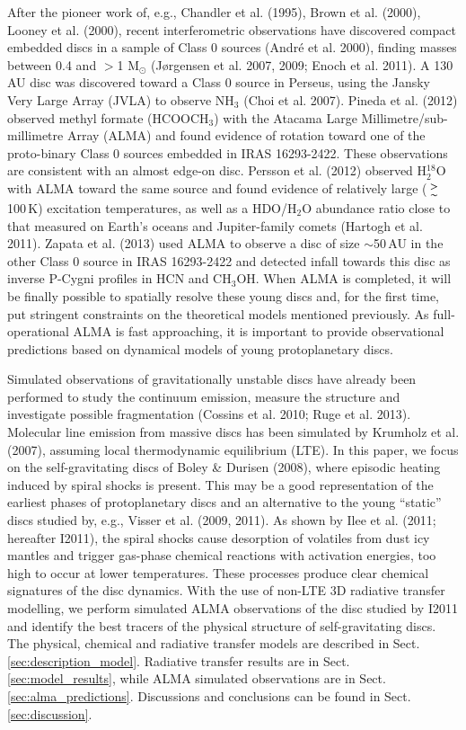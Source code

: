 \documentclass[useAMS,usenatbib]{mn2e}
\begin{document}
After the pioneer work of, e.g., Chandler et al. (1995), Brown et al. (2000), Looney et al. (2000), recent interferometric observations have discovered compact embedded discs in a sample of Class 0 sources (Andr\'e et al. 2000), finding masses between 0.4 and  $>$1 M$_{\odot}$ (J\o rgensen et al. 2007, 2009; Enoch et al. 2011). A 130\,AU disc was discovered toward a Class 0 source in Perseus, using the Jansky Very Large Array (JVLA) to observe NH$_3$ (Choi et al. 2007). Pineda et al. (2012) observed methyl formate (HCOOCH$_3$) with the Atacama Large Millimetre/sub-millimetre Array (ALMA) and found evidence of rotation toward one of the proto-binary Class 0 sources embedded in IRAS 16293-2422. These observations are consistent with an almost edge-on disc. Persson et al. (2012) observed H$_2^{18}$O with ALMA toward the same source and found evidence of relatively large ($\ga$100\,K) excitation temperatures, as well as a HDO/H$_2$O abundance ratio close to that measured on Earth's oceans and Jupiter-family comets (Hartogh et al. 2011). Zapata et al. (2013) used ALMA to observe a disc of size $\sim$50$\,$AU in the other Class 0 source in IRAS 16293-2422 and detected infall towards this disc as inverse P-Cygni profiles in HCN and CH$_3$OH. When ALMA is completed, it will be finally possible to spatially resolve these young discs and, for the first time, put stringent constraints on the theoretical models mentioned previously. As full-operational ALMA is fast approaching, it is important to provide observational predictions based on dynamical models of young protoplanetary discs. \newline 

Simulated observations of gravitationally unstable discs have already been performed to study the continuum emission, measure the structure and investigate possible fragmentation (Cossins et al. 2010; Ruge et al. 2013). Molecular line emission from massive discs has been simulated by Krumholz et al. (2007), assuming local thermodynamic equilibrium (LTE). In this paper, we focus on the self-gravitating discs of Boley \& Durisen (2008), where episodic heating induced by spiral shocks is present. This may be a good representation of the earliest phases of protoplanetary discs and an alternative to the young ``static'' discs studied by, e.g., Visser et al. (2009, 2011). As shown by Ilee et al. (2011; hereafter I2011), the spiral shocks cause desorption of volatiles from dust icy mantles and trigger gas-phase chemical reactions with activation energies, too high to occur at lower temperatures. These processes produce clear chemical signatures of the disc dynamics. With the use of non-LTE 3D radiative transfer modelling, we perform simulated ALMA observations of the disc studied by I2011 and identify the best tracers of the physical structure of self-gravitating discs. The physical, chemical and radiative transfer models are described in Sect.\,\ref{sec:description_model}. Radiative transfer results are in Sect.\,\ref{sec:model_results}, while ALMA simulated observations are in Sect.\,\ref{sec:alma_predictions}. Discussions and conclusions can be found in Sect.\,\ref{sec:discussion}. 
\end{document}
